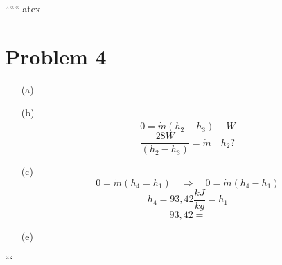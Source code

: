 
``````latex

\section*{Problem 4}

\begin{itemize}
    \item[(a)] 
    \item[(b)] 
    \begin{equation*}
        0 = \dot{m} (h_2 - h_3) - \dot{W}
    \end{equation*}
    \begin{equation*}
        \frac{28W}{(h_2 - h_3)} = \dot{m} \quad h_2 ?
    \end{equation*}
    \item[(c)] 
    \begin{equation*}
        0 = \dot{m} (h_4 = h_1) \quad \Rightarrow \quad 0 = \dot{m} (h_4 - h_1)
    \end{equation*}
    \begin{equation*}
        h_4 = 93,42 \frac{kJ}{kg} = h_1
    \end{equation*}
    \begin{equation*}
        93,42 =
    \end{equation*}
    \item[(e)] 
\end{itemize}

```
